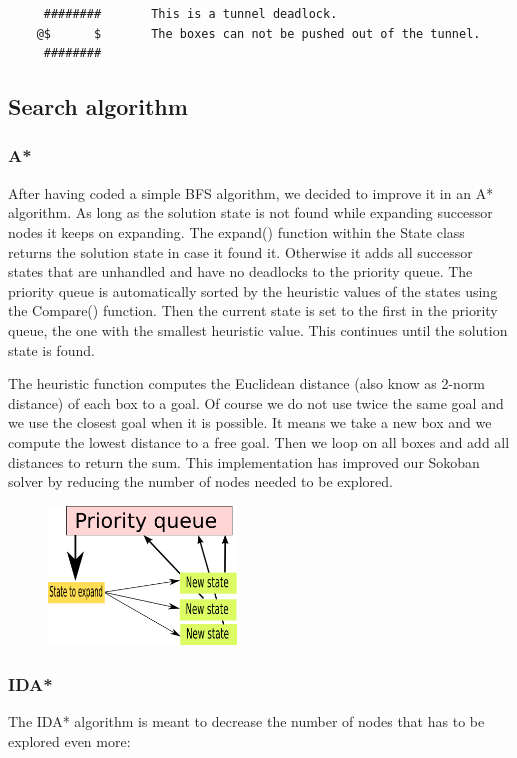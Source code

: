 \documentclass[a4paper,10pt]{article}
\begin{document}
	\begin{verbatim}
	 ########       This is a tunnel deadlock.
	@$      $       The boxes can not be pushed out of the tunnel.
	 ########       
	\end{verbatim}

	\subsection{Search algorithm}
	\subsubsection{A*}
	After having coded a simple BFS algorithm, we decided to improve it in an A* algorithm. 
	As long as the solution state is not found while expanding successor nodes it keeps on expanding. The expand() function within the State class returns the solution state in case it found it. Otherwise it adds all successor states that are unhandled and have no deadlocks to the priority queue. The priority queue is automatically sorted by the heuristic values of the states using the Compare() function. Then the current state is set to the first in the priority queue, the one with the smallest heuristic value. This continues until the solution state is found.
	
	The heuristic function computes the Euclidean distance (also know as 2-norm distance) of each  box to a goal. 
	Of course we do not use twice the same goal and we use the closest goal when it is possible. It means we take a new box and we compute the lowest distance to a free goal. Then we loop on all boxes and add all distances to return the sum. 
	This implementation has improved our Sokoban solver by reducing the number of nodes needed to be explored.

	\begin{figure}[h]
	\centerline{\includegraphics[height=5 cm, width=5cm]{./priority_state.png}}
	\end{figure}

	\subsubsection{IDA*}
	The IDA* algorithm is meant to decrease the number of nodes that has to be explored even more:
\end{document}
